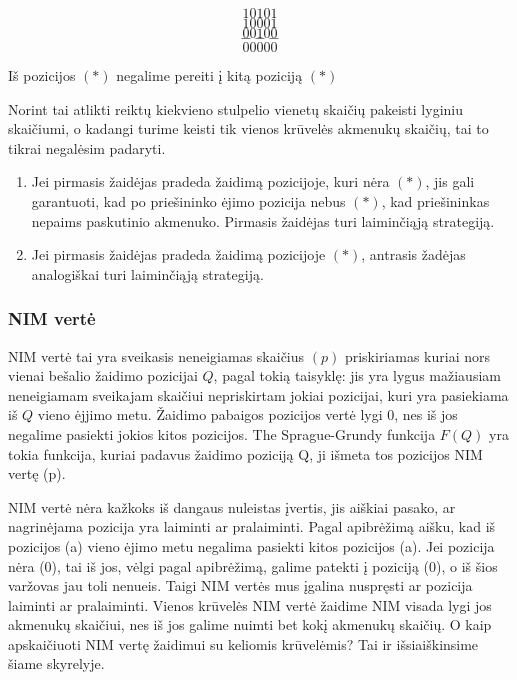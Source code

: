 $$10101$$$$10001$$$$00100$$$$---$$$$00000$$

\begin{teig}
  Iš pozicijos $(*)$ negalime pereiti į kitą poziciją $(*)$
\end{teig}

Norint tai atlikti reiktų kiekvieno stulpelio vienetų skaičių pakeisti
lyginiu skaičiumi, o kadangi turime keisti tik vienos krūvelės akmenukų
skaičių, tai to tikrai negalėsim padaryti.

\begin{enumerate}
  \item Jei pirmasis žaidėjas pradeda žaidimą pozicijoje, kuri nėra $(*)$,
    jis gali garantuoti, kad po priešininko ėjimo pozicija nebus $(*)$, kad
    priešininkas nepaims paskutinio akmenuko. Pirmasis žaidėjas turi
    laiminčiąją strategiją.
  \item Jei pirmasis žaidėjas pradeda žaidimą pozicijoje $(*)$, antrasis
    žadėjas analogiškai turi laiminčiąją strategiją. 
\end{enumerate}


\subsubsection{NIM vertė}

\begin{api}
  NIM vertė tai yra sveikasis neneigiamas skaičius $(p)$ priskiriamas kuriai
  nors vienai bešalio žaidimo pozicijai $Q$, pagal tokią taisyklę: jis yra
  lygus mažiausiam neneigiamam sveikajam skaičiui nepriskirtam jokiai
  pozicijai, kuri yra pasiekiama iš $Q$ vieno ėjjimo metu. Žaidimo pabaigos
  pozicijos vertė lygi $0$, nes iš jos negalime pasiekti jokios kitos
  pozicijos. The Sprague-Grundy funkcija $F(Q)$ yra tokia funkcija, kuriai
  padavus žaidimo poziciją Q, ji išmeta tos pozicijos NIM vertę (p).  
\end{api}

NIM vertė nėra kažkoks iš dangaus nuleistas įvertis, jis aiškiai pasako, ar
nagrinėjama pozicija yra laiminti ar pralaiminti. Pagal apibrėžimą aišku, kad
iš pozicijos (a) vieno ėjimo metu negalima pasiekti kitos pozicijos (a). Jei
pozicija nėra (0), tai iš jos, vėlgi pagal apibrėžimą, galime patekti į
poziciją (0), o iš šios varžovas jau toli nenueis. Taigi NIM vertės mus įgalina
nuspręsti ar pozicija laiminti ar pralaiminti. Vienos krūvelės NIM vertė
žaidime NIM visada lygi jos akmenukų skaičiui, nes iš jos galime nuimti bet
kokį akmenukų skaičių. O kaip apskaičiuoti NIM vertę žaidimui su keliomis
krūvelėmis? Tai ir išsiaiškinsime šiame skyrelyje. 

